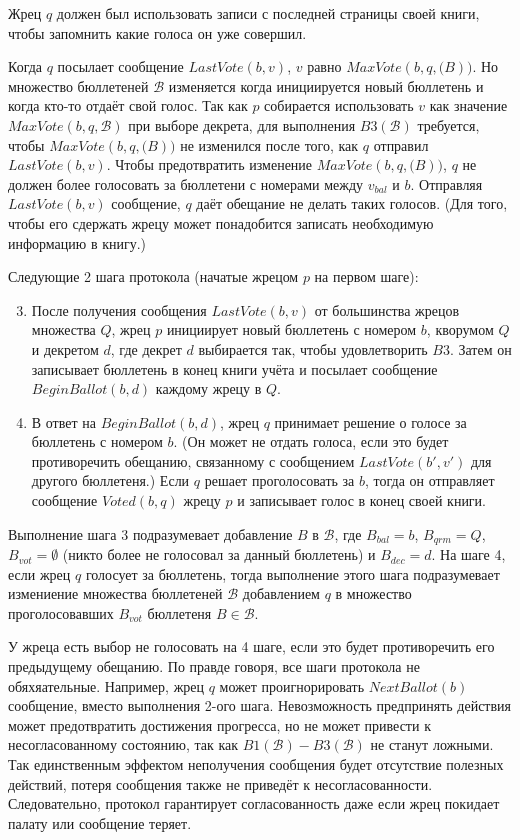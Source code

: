 \documentclass[12pt, a4paper]{article} %
\begin{document}
Жрец $q$ должен был использовать записи с последней страницы своей книги, чтобы запомнить какие голоса он уже совершил.

Когда $q$ посылает сообщение $LastVote(b, v)$, $v$ равно $MaxVote(b, q, \mathcal(B))$. Но множество бюллетеней $\mathcal{B}$ изменяется когда инициируется новый бюллетень и когда кто-то отдаёт свой голос. Так как $p$ собирается использовать $v$ как значение $MaxVote(b, q, \mathcal{B})$ при выборе декрета, для выполнения $B3(\mathcal{B})$ требуется, чтобы $MaxVote(b, q, \mathcal(B))$ не изменился после того, как $q$ отправил $LastVote(b, v)$. Чтобы предотвратить изменение $MaxVote(b, q, \mathcal(B))$, $q$ не должен более голосовать за бюллетени с номерами между $v_{bal}$ и $b$. Отправляя $LastVote(b, v)$ сообщение, $q$ даёт обещание не делать таких голосов. (Для того, чтобы его сдержать жрецу может понадобится записать необходимую информацию в книгу.)

Следующие 2 шага протокола (начатые жрецом $p$ на первом шаге):
\begin{enumerate} \setcounter{enumi}{2}
    \item После получения сообщения $LastVote(b, v)$ от большинства жрецов множества $Q$, жрец $p$ инициирует новый бюллетень с номером $b$, кворумом $Q$ и декретом $d$, где декрет $d$ выбирается так, чтобы удовлетворить $B3$. Затем он записывает бюллетень в конец книги учёта и посылает сообщение $BeginBallot(b, d)$ каждому жрецу в $Q$.
    \item В ответ на $BeginBallot(b, d)$, жрец $q$ принимает решение о голосе за бюллетень с номером $b$. (Он может не отдать голоса, если это будет противоречить обещанию, связанному с сообщением $LastVote(b', v')$ для другого бюллетеня.) Если $q$ решает проголосовать за $b$, тогда он отправляет сообщение $Voted(b, q)$ жрецу $p$ и записывает голос в конец своей книги.
\end{enumerate}

Выполнение шага 3 подразумевает добавление $B$ в $\mathcal{B}$, где $B_{bal} = b$, $B_{qrm} = Q$, $B_{vot} = \emptyset$ (никто более не голосовал за данный бюллетень) и $B_{dec} = d$. На шаге 4, если жрец $q$ голосует за бюллетень, тогда выполнение этого шага подразумевает измениение множества бюллетеней $\mathcal{B}$ добавлением $q$ в множество проголосовавших $B_{vot}$ бюллетеня $B \in \mathcal{B}$.


У жреца есть выбор не голосовать на 4 шаге, если это будет противоречить его предыдущему обещанию. По правде говоря, все шаги протокола не обяхяательные. Например, жрец $q$ может проигнорировать $NextBallot(b)$ сообщение, вместо выполнения 2-ого шага. Невозможность предпринять действия может предотвратить достижения прогресса, но не может привести к несогласованному состоянию, так как $B1(\mathcal{B}) - B3(\mathcal{B})$ не станут ложными. Так единственным эффектом неполучения сообщения будет отсутствие полезных действий, потеря сообщения также не приведёт к несогласованности. Следовательно, протокол гарантирует согласованность даже если жрец покидает палату или сообщение теряет.
\end{document}
